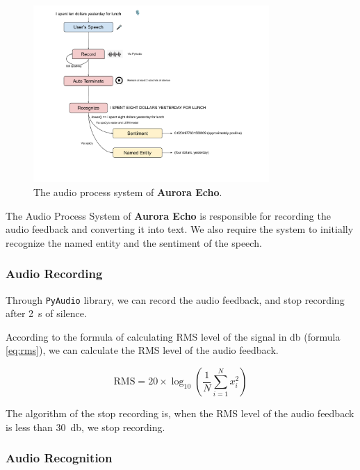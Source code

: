 \documentclass{article}
\begin{document}
    \begin{figure}[hhhh]
        \centering
        \includegraphics[width=0.8\textwidth]{./figures/audio-arch}
        \caption{The audio process system of \textbf{Aurora Echo}.}
        \label{fig:audio-process}
    \end{figure}

    The Audio Process System of \textbf{Aurora Echo} is responsible for recording the audio feedback and converting it into text.
    We also require the system to initially recognize the named entity and the sentiment of the speech.

    \subsubsection{Audio Recording}\label{subsubsec:audio-rec}

    Through \texttt{PyAudio}\cite{mark2018} library, we can record the audio feedback, and stop recording after \qty{2}{\second} of silence.

    According to the formula of calculating RMS level of the signal in \unit{\decibel} (formula \ref{eq:rms}), we can calculate the RMS level of the audio feedback.

    \begin{equation}
        \mathrm{RMS} = 20 \times \log_{10} \left( \frac{1}{N} \sum_{i=1}^{N} x_i^2 \right)\label{eq:rms}
    \end{equation}

    The algorithm of the stop recording is, when the RMS level of the audio feedback is less than \qty{30}{\decibel}, we stop recording.

    \subsubsection{Audio Recognition}\label{subsubsec:audio-recog}
\end{document}
